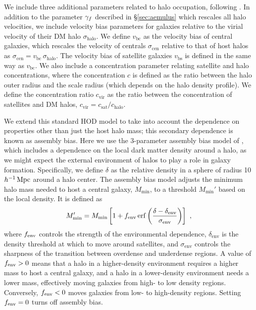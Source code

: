 We include three additional parameters related to halo occupation, following \cite{Zhai2019}.
In addition to the parameter $\gamma_f$ described in \S\ref{sec:aemulus} which rescales all halo velocities, we include velocity bias parameters for galaxies relative to the virial velocity of their DM halo $\sigma_\mathrm{halo}$.
We define $v_\mathrm{bc}$ as the velocity bias of central galaxies, which rescales the velocity of centrals $\sigma_\mathrm{cen}$ relative to that of host halos as $\sigma_\mathrm{cen} = v_\mathrm{bc} \,\sigma_\mathrm{halo}$.
The velocity bias of satellite galaxies $v_\mathrm{bs}$ is defined in the same way as $v_\mathrm{bc}$.
We also include a concentration parameter relating satellite and halo concentrations, where the concentration $c$ is defined as the ratio between the halo outer radius and the scale radius (which depends on the halo density profile).
We define the concentration ratio $c_\mathrm{vir}$ as the ratio between the concentration of satellites and DM halos, $c_\mathrm{vir} = c_\mathrm{sat}/c_\mathrm{halo}$.

We extend this standard HOD model to take into account the dependence on properties other than just the host halo mass; this secondary dependence is known as assembly bias.
Here we use the 3-parameter assembly bias model of \cite{WalshTinker2019}, which includes a dependence on the local dark matter density around a halo, as we might expect the external environment of halos to play a role in galaxy formation.
Specifically, we define $\delta$ as the relative density in a sphere of radius 10 $h^{-1}\,\mathrm{Mpc}$ around a halo center.
The assembly bias model adjusts the minimum halo mass needed to host a central galaxy, $M_\mathrm{min}$, to a threshold $M_\mathrm{min}'$ based on the local density.
It is defined as
\begin{equation}
	M_\mathrm{min}' = M_\mathrm{min} \left[ 1 + f_\mathrm{env} \, \mathrm{erf}
	\left(\frac{ \delta - \delta_\mathrm{env} }{\sigma_\mathrm{env}}\right) \right] ~,
\end{equation}
where $f_\mathrm{env}$ controls the strength of the environmental dependence, $\delta_\mathrm{env}$ is the density threshold at which to move around satellites, and $\sigma_\mathrm{env}$ controls the sharpness of the transition between overdense and underdense regions.
A value of $f_\mathrm{env} > 0$ means that a halo in a higher-density environment requires a higher mass to host a central galaxy, and a halo in a lower-density environment needs a lower mass, effectively moving galaxies from high- to low density regions.
Conversely, $f_\mathrm{env} < 0$ moves galaxies from low- to high-density regions.
Setting $f_\mathrm{env} = 0$ turns off assembly bias.

